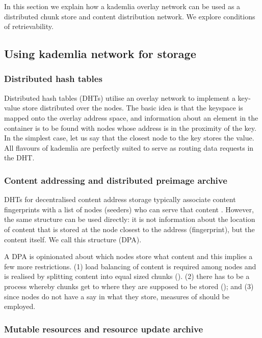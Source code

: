 In this section we explain how a  kademlia overlay network can be used as a distributed chunk store and content distribution network. We explore conditions of retrievability.

\subsection{Using kademlia network for storage}

\subsubsection{Distributed hash tables}
 
Distributed hash tables (DHTs) utilise an overlay network to implement a key-value store distributed over the nodes. The basic idea is that the keyspace is mapped onto the overlay address space, and information about an element in the container is to be found with nodes whose address is in the proximity of the key. In the simplest case, let us say that the closest node to the key stores the value. 
All flavours of kademlia are perfectly suited to serve as routing data requests in the DHT. 

\subsubsection{Content addressing and distributed preimage archive}

DHTs for decentralised content address storage typically associate content fingerprints with a list of nodes (seeders) who can serve that content \cite{ipfs2014}. However, the same structure can be used directly: it is not information about the location of content that is stored at the node closest to the address (fingerprint), but the content itself. We call this structure  (DPA). 

A DPA is opinionated about which nodes store what content and this implies a few more restrictions. (1) load balancing of content is required among nodes and is realised by splitting content into equal sized chunks (). (2) there has to be a process whereby chunks get to where they are supposed to be stored (); and (3) since nodes do not have a say in what they store, measures of   should be employed. 


\subsubsection{Mutable resources and resource update archive}

